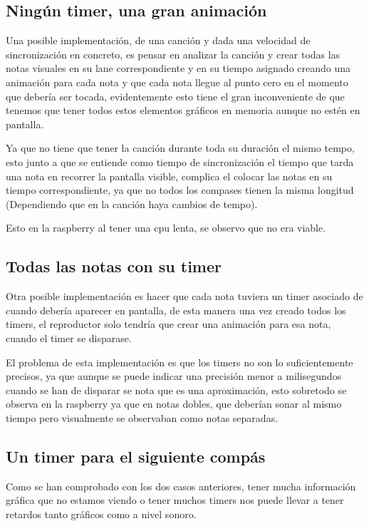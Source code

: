 \documentclass[a4paper,11pt,oneside]{book}
\begin{document}
\subsection{Ningún timer, una gran animación}

Una posible implementación, de una canción y dada una velocidad de sincronización en concreto, es pensar en analizar la canción y crear todas las notas visuales en su lane correspondiente y en su tiempo asignado creando una animación para cada nota y que cada nota llegue al punto cero en el momento que debería ser tocada, evidentemente esto tiene el gran inconveniente de que tenemos que tener todos estos elementos gráficos en memoria aunque no estén en pantalla.

Ya que no tiene que tener la canción durante toda su duración el mismo tempo, esto junto a que se entiende como tiempo de sincronización el tiempo que tarda una nota en recorrer la pantalla visible, complica el colocar las notas en su tiempo correspondiente, ya que no todos los compases tienen la misma longitud (Dependiendo que en la canción haya cambios de tempo).

Esto en la raspberry al tener una cpu lenta, se observo que no era viable. 

\subsection{Todas las notas con su timer}

Otra posible implementación es hacer que cada nota tuviera un timer asociado de cuando debería aparecer en pantalla, de esta manera una vez creado todos los timers, el reproductor solo tendría que crear una animación para esa nota, cuando el timer se disparase.

El problema de esta implementación es que los timers no son lo suficientemente precisos, ya que aunque se puede indicar una precisión menor a  milisegundos cuando se han de disparar se nota que es una aproximación, esto sobretodo se observa en la raspberry ya que en notas dobles, que deberían sonar al mismo tiempo pero visualmente se observaban como notas separadas.


\subsection{Un timer para el siguiente compás}

Como se han comprobado con los dos casos anteriores, tener mucha información gráfica que no estamos viendo o tener muchos timers nos puede llevar a tener retardos tanto gráficos como a nivel sonoro.
\end{document}
